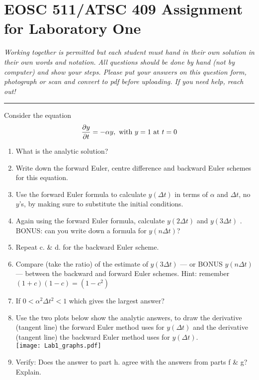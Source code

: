 \documentclass[12pt]{article}
\begin{document}
\section*{EOSC 511/ATSC 409 Assignment for Laboratory One}

{\it Working together is permitted but each student must hand in their own solution in their own words and notation.  All questions should be done by hand (not by computer) and show your steps. Please put your answers on this question form, photograph or scan and convert to pdf before uploading.  If you need help, reach out!}

\begin{center}
\hrule
\end{center}


Consider the equation $$\frac {\partial y}{\partial t} = - \alpha y,\ {\rm with}\ y=1\ {\rm at}\ t=0$$
\begin{enumerate}
\item    What is the analytic solution?
\vspace{1in}
\item    Write down the forward Euler, centre difference and backward Euler schemes for this equation.
\vspace{2.5in}
\item Use the forward Euler formula to calculate $y(\Delta t)$ in terms of $\alpha$ and $\Delta t$, no
$y$'s, by making sure to substitute the initial conditions.
\vspace{1in}
\clearpage
\item Again using the forward Euler formula, calculate $y(2\Delta t)$ and $y(3\Delta t)$
. BONUS: can you write down a formula for $y(n\Delta t)$?
\vspace{2in}
\item Repeat c. \& d. for the backward Euler scheme.
\vspace{3in}
\item Compare (take the ratio) of the estimate of $y(3\Delta t)$
--- or BONUS $y(n\Delta t)$
--- between the backward and forward Euler schemes.  Hint: remember $(1 + c)(1 - c) = (1- c^2)$
\vspace{2in}
\clearpage
\item If $0 < \alpha^2 \Delta t^2 < 1$ which gives the largest answer?
\vspace{2in}
\item Use the two plots below show the analytic answers, to draw the derivative (tangent line) the forward Euler method uses for $y(\Delta t)$
and the derivative (tangent line) the backward Euler method uses for $y(\Delta t)$.\\
\texttt{[image: Lab1\_graphs.pdf]}
\item Verify: Does the answer to part h. agree with the answers from parts f \& g? Explain.
\end{enumerate}
\end{document}
